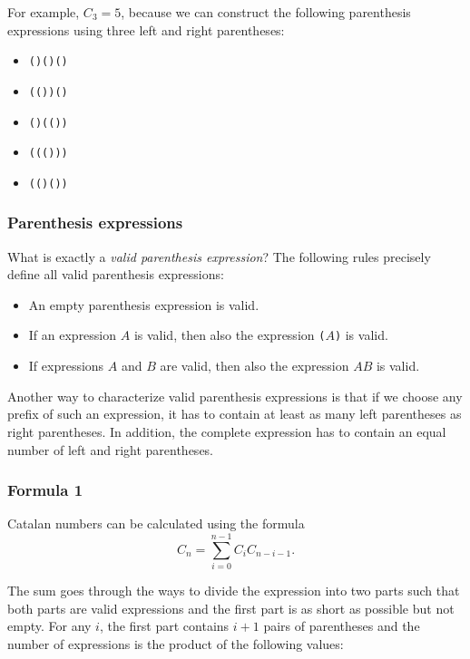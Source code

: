 For example, $C_3=5$, because
we can construct the following parenthesis
expressions using three
left and right parentheses:

\begin{itemize}[noitemsep]
\item \texttt{()()()}
\item \texttt{(())()}
\item \texttt{()(())}
\item \texttt{((()))}
\item \texttt{(()())}
\end{itemize}

\subsubsection{Parenthesis expressions}


What is exactly a \emph{valid parenthesis expression}?
The following rules precisely define all
valid parenthesis expressions:

\begin{itemize}
\item An empty parenthesis expression is valid.
\item If an expression $A$ is valid,
then also the expression
\texttt{(}$A$\texttt{)} is valid.
\item If expressions $A$ and $B$ are valid,
then also the expression $AB$ is valid.
\end{itemize}

Another way to characterize valid 
parenthesis expressions is that if
we choose any prefix of such an expression,
it has to contain at least as many left
parentheses as right parentheses.
In addition, the complete expression has to
contain an equal number of left and right
parentheses.

\subsubsection{Formula 1}

Catalan numbers can be calculated using the formula
\[ C_n = \sum_{i=0}^{n-1} C_{i} C_{n-i-1}.\]

The sum goes through the ways to divide the
expression into two parts
such that both parts are valid
expressions and the first part is as short as possible
but not empty.
For any $i$, the first part contains $i+1$ pairs
of parentheses and the number of expressions
is the product of the following values:

